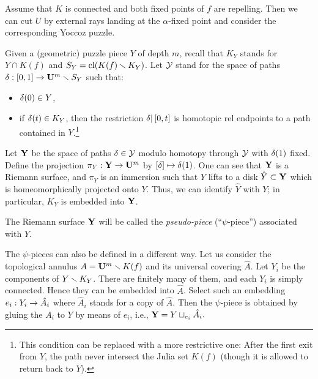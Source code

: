 Assume that $K$ is connected and both fixed points of $f$ are repelling.
Then we can cut $U$ by external rays landing at the $\alpha$-fixed point and consider the corresponding Yoccoz puzzle.
%
%

Given a (geometric) puzzle piece $Y$ of depth $m$,
recall that $K_Y$ stands for $Y\cap K(f)$ and  $S_Y = \operatorname{cl} (K(f) \smallsetminus K_Y)$.
Let  ${\mathcal Y}$ stand for the space of paths ${\delta}: [0,1] \to {\mathbf{U}}^m \smallsetminus S_Y$
such that:
\begin{itemize}
  \item ${\delta}(0)\in Y$,
  \item if ${\delta}(t)\in K_Y$, then the restriction ${\delta}|\, [0,t]$ is homotopic rel endpoints
       to a path contained in $Y$.\footnote{This condition can be replaced with a more restrictive one:
 After the first exit from $Y$, the path never intersect the Julia set $K(f)$
  (though it is allowed to return back to $Y$).}
\end{itemize}
Let ${\mathbf{Y}}$ be the space of paths ${\delta}\in {\mathcal Y}$ modulo  homotopy through ${\mathcal Y}$ with ${\delta}(1)$ fixed.
Define the projection $\pi_Y: {\mathbf{Y}}\rightarrow {\mathbf{U}}^m$ by  $[{\delta}]\mapsto {\delta}(1)$.
One can see that ${\mathbf{Y}}$ is a Riemann surface,
and $\pi_Y$ is an immersion such that
   $Y$ lifts to  a disk $\hat Y\subset {\mathbf{Y}}$ which is  homeomorphically projected onto $Y$.
 Thus, we can identify $\hat Y$ with $Y$; in particular,  $K_Y$ is embedded into ${\mathbf{Y}}$.

   The Riemann surface ${\mathbf{Y}}$ will be called the {\it pseudo-piece} (``$\psi$-piece'') associated with $Y$.

\ssk The $\psi$-pieces can also be defined in a different way.
Let us consider the topological annulus $A={\mathbf{U}}^m  \smallsetminus K(f)$ and its universal covering $\hat A$.
Let $Y_i$ be the components of $Y\smallsetminus K_Y$. There are finitely many of them,
and each $Y_i$ is simply connected. Hence they can be embedded into $\hat A$.
Select such an embedding $e_i: Y_i\rightarrow \hat A_i$ where $\hat A_i$ stands for a copy of $\hat A$.
Then the $\psi$-piece is obtained by gluing the $A_i$ to $Y$ by means of $e_i$, i.e.,
${\mathbf{Y}}= Y \sqcup_{e_i} \hat A_i.$

